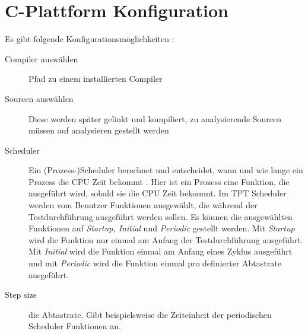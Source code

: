 \section*{C-Plattform Konfiguration}
Es gibt folgende Konfigurationsmöglichkeiten \parencite[S. 862 ff.]{userguide}:
\begin{description}
\item[Compiler auswählen] Pfad zu einem installierten Compiler
\item[Sourcen auswählen] Diese werden später gelinkt und kompiliert, zu analysierende Sourcen müssen auf analysieren gestellt werden
\item[Scheduler] Ein (Prozess-)Scheduler berechnet und entscheidet, wann und wie lange ein Prozess die CPU Zeit bekommt \parencite[S. 44]{scheduler}.
Hier ist ein Prozess eine Funktion, die ausgeführt wird, sobald sie die CPU Zeit bekommt. %
Im TPT Scheduler werden vom Benutzer Funktionen ausgewählt, die während der Testdurchführung ausgeführt werden sollen.
Es können die ausgewählten Funktionen auf \textit{Startup, Initial} und \textit{Periodic} gestellt werden.
Mit \textit{Startup} wird die Funktion nur einmal am Anfang der Testdurchführung ausgeführt. Mit \textit{Initial} wird die Funktion
einmal am Anfang eines Zyklus ausgeführt und mit \textit{Periodic} wird die Funktion einmal pro definierter Abtastrate ausgeführt.
\item[Step size] die Abtastrate. Gibt beispielsweise die Zeiteinheit der periodischen Scheduler Funktionen an.
\end{description}
